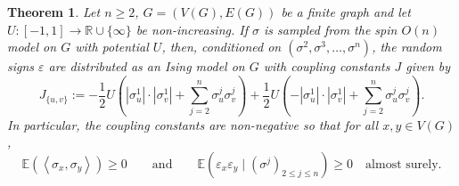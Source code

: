 \documentclass[12pt,reqno]{article}
\def\R{\mathbb{R}}
\def\E{\mathbb{E}}
\newtheorem{theorem}{Theorem}[section]
\def\eps{\varepsilon}
\begin{document}
\begin{theorem}\label{thm:conditioning_gives_Ising}
	Let $n\ge 2$, $G = (V(G), E(G))$ be a finite graph and let $U:[-1,1]\to\R\cup\{\infty\}$
	be \emph{non-increasing}. If $\sigma$ is sampled from the spin $O(n)$ model on $G$ with potential $U$, then, conditioned on $(\sigma^2, \sigma^3,\ldots, \sigma^n)$, the random signs $\eps$ are distributed as an Ising model on $G$
	with coupling constants $J$ given by
	\[ J_{\{u,v\}} := - \frac12 U\left(|\sigma_u^1|\cdot |\sigma_v^1| + \sum_{j=2}^n\sigma_u^j \sigma_v^j\right) + \frac12 U\left(-|\sigma_u^1|\cdot |\sigma_v^1| + \sum_{j=2}^n\sigma_u^j \sigma_v^j\right) .\]
	In particular, the coupling constants are non-negative so that for all $x,y\in V(G)$,
	\begin{equation*}
	\E(\left\langle\sigma_x,\sigma_y\right\rangle)\ge 0 \qquad\text{and}\qquad \E\left(\eps_x \eps_y\; |\; (\sigma^j)_{2\le j\le n}\right)\ge
	0\quad\text{almost surely}.
	\end{equation*}
\end{theorem}
\end{document}
